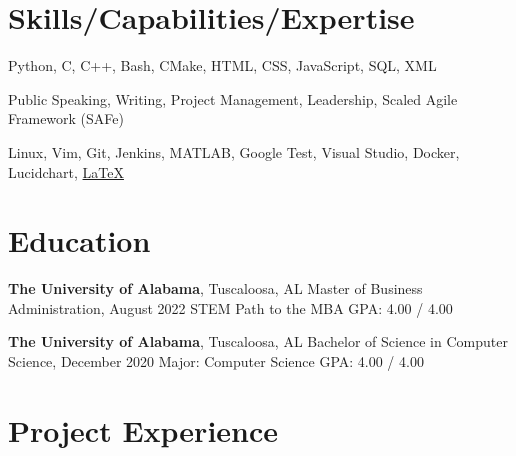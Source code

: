 \documentclass[hidelinks, 11pt]{article}
\begin{document}
\makecvtitle
\vspace{0.5mm}

\section{Skills/Capabilities/Expertise}

\begin{description}[widest=Programming Langauges:]
  \item[Programming Languages:]	Python, C, C++, Bash, CMake, HTML, CSS, JavaScript, SQL, XML
  \item[Soft Skills:]	Public Speaking, Writing, Project Management, Leadership, Scaled Agile Framework (SAFe)
  \item[Tools:]	Linux, Vim, Git, Jenkins, MATLAB, Google Test, Visual Studio, Docker, Lucidchart, \color{blue}\href{https://github.com/chwerth/LaTeX\_Resume}{LaTeX}
\end{description}

\section{Education}
\vspace{-1.4mm}
\begin{multicols}{2}

  \begin{minipage}{0.5\textwidth}
    \textbf{The University of Alabama}, Tuscaloosa, AL \newline
    Master of Business Administration, August 2022 \newline
    STEM Path to the MBA \newline
    GPA: 4.00 / 4.00
  \end{minipage}

  \begin{minipage}{0.5\textwidth}
    \textbf{The University of Alabama}, Tuscaloosa, AL \newline
    Bachelor of Science in Computer Science, December 2020 \newline
    Major: Computer Science \newline
    GPA: 4.00 / 4.00
  \end{minipage}

\end{multicols}

\section{Project Experience}
\end{document}
